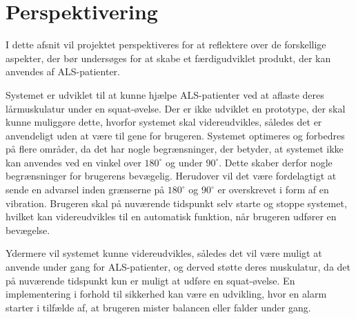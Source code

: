 \section{Perspektivering}
I dette afsnit vil projektet perspektiveres for at reflektere over de forskellige aspekter, der bør undersøges for at skabe et færdigudviklet produkt, der kan anvendes af ALS-patienter. 

Systemet er udviklet til at kunne hjælpe ALS-patienter ved at aflaste deres lårmuskulatur under en squat-øvelse. Der er ikke udviklet en prototype, der skal kunne muliggøre dette, hvorfor systemet skal videreudvikles, således det er anvendeligt uden at være til gene for brugeren. Systemet optimeres og forbedres på flere områder, da det har nogle begrænsninger, der betyder, at systemet ikke kan anvendes ved en vinkel over $180^{\circ}$ og under $90^{\circ}$. Dette skaber derfor nogle begrænsninger for brugerens bevægelig. Herudover vil det være fordelagtigt at sende en advarsel inden grænserne på $180^{\circ}$ og  $90^{\circ}$ er overskrevet i form af en vibration. Brugeren skal på nuværende tidspunkt selv starte og stoppe systemet, hvilket kan videreudvikles til en automatisk funktion, når brugeren udfører en bevægelse.  


Ydermere vil systemet kunne videreudvikles, således det vil være muligt at anvende under gang for ALS-patienter, og derved støtte deres muskulatur, da det på nuværende tidspunkt kun er muligt at udføre en squat-øvelse. En implementering i forhold til sikkerhed kan være en udvikling, hvor en alarm starter i tilfælde af, at brugeren mister balancen eller falder under gang. 




